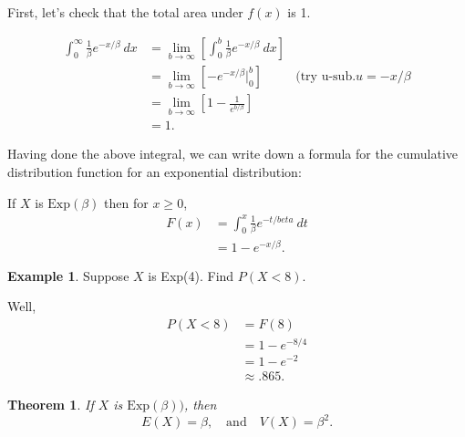 \documentclass[
]{book}
\newtheorem{theorem}{Theorem}[chapter]
\theoremstyle{definition}
\theoremstyle{definition}
\newtheorem{example}{Example}[chapter]
\theoremstyle{definition}
\theoremstyle{definition}
\theoremstyle{remark}
\begin{document}
First, let's check that the total area under \(f(x)\) is 1.

\begin{align*}
\int_0^\infty \frac{1}{\beta}e^{-x/\beta}~dx &= \lim_{b\to\infty}\left[\int_0^b \frac{1}{\beta}e^{-x/\beta}~dx\right] \\
&= \lim_{b\to\infty}\left[-e^{-x/\beta}\biggr|_0^b \right] & \text{(try u-sub.} u=-x/\beta \\
&= \lim_{b \to \infty}\left[1 - \frac{1}{e^{b/\beta}}\right]\\
&= 1.
\end{align*}

Having done the above integral, we can write down a formula for the cumulative distribution function for an exponential distribution:

If \(X\) is \(\text{Exp}(\beta)\) then for \(x \geq 0\),
\begin{align*}
F(x) &= \int_0^x \frac{1}{\beta}e^{-t/beta}~dt\\
    &= 1 - e^{-x/\beta}.
\end{align*}

\begin{example}
Suppose \(X\) is Exp(4). Find \(P(X < 8)\).

Well,
\begin{align*}
P(X < 8) &= F(8)\\
        &= 1 - e^{-8/4} \\
        &= 1 - e^{-2} \\
        &\approx .865.
\end{align*}
\end{example}

\begin{theorem}
\protect\hypertarget{thm:exponential-EandV}{}\label{thm:exponential-EandV}If \(X\) is \(\text{Exp}(\beta))\), then \[E(X) = \beta, ~~~ \text{ and } ~~~ V(X) = \beta^2.\]
\end{theorem}
\end{document}

